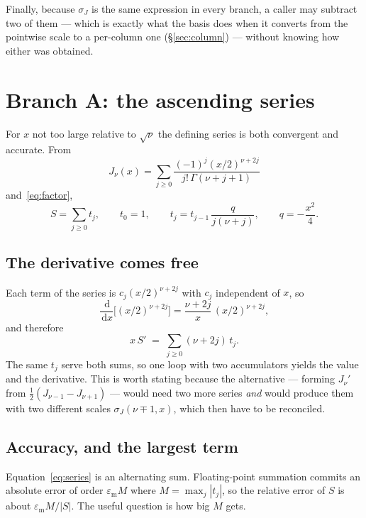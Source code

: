 \documentclass[11pt]{article}
\theoremstyle{remark}
\newcommand{\dd}{\,\mathrm{d}}
\newcommand{\eps}{\varepsilon_{\mathrm{m}}}
\begin{document}
Finally, because $\sigma_J$ is the same expression in every branch, a caller may subtract
two of them --- which is exactly what the basis does when it converts from the pointwise
scale to a per-column one (\S\ref{sec:column}) --- without knowing how either was obtained.

\section{Branch A: the ascending series}

For $x$ not too large relative to $\sqrt{\nu}$ the defining series is both convergent and
accurate. From
\[
  J_\nu(x)=\sum_{j\ge0}\frac{(-1)^j (x/2)^{\nu+2j}}{j!\,\Gamma(\nu+j+1)}
\]
and~\eqref{eq:factor},
\begin{equation}
  S=\sum_{j\ge0} t_j,
  \qquad t_0=1,
  \qquad t_j=t_{j-1}\,\frac{q}{j(\nu+j)},
  \qquad q=-\frac{x^2}{4}.
  \label{eq:series}
\end{equation}

\subsection{The derivative comes free}

Each term of the series is $c_j (x/2)^{\nu+2j}$ with $c_j$ independent of $x$, so
\[
  \frac{\dd}{\dd x}\Big[(x/2)^{\nu+2j}\Big]
  = \frac{\nu+2j}{x}\,(x/2)^{\nu+2j},
\]
and therefore
\begin{equation}
  x\,S' \;=\; \sum_{j\ge0} (\nu+2j)\,t_j .
  \label{eq:deriv}
\end{equation}
The same $t_j$ serve both sums, so one loop with two accumulators yields the value and the
derivative. This is worth stating because the alternative --- forming $J_\nu'$ from
$\tfrac12(J_{\nu-1}-J_{\nu+1})$ --- would need two more series \emph{and} would produce them
with two different scales $\sigma_J(\nu\mp1,x)$, which then have to be reconciled.

\subsection{Accuracy, and the largest term}

Equation~\eqref{eq:series} is an alternating sum. Floating-point summation commits an
absolute error of order $\eps M$ where $M=\max_j|t_j|$, so the relative error of $S$ is about
$\eps M/|S|$. The useful question is how big $M$ gets.
\end{document}
